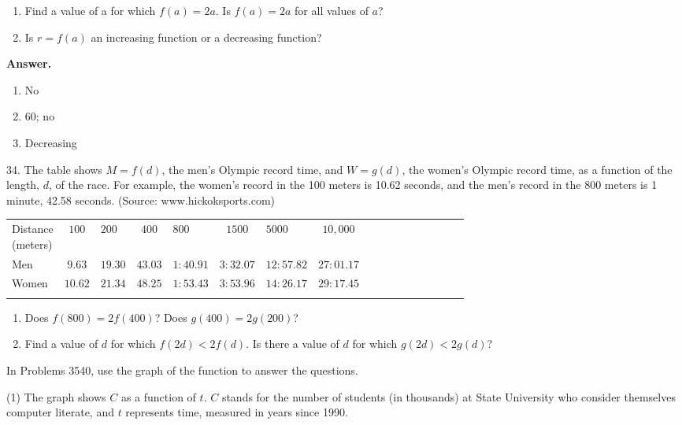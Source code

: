 \documentclass[10pt,]{book}
\makeatletter
\theoremstyle{plain}
\theoremstyle{definition}
\theoremstyle{definition}
\theoremstyle{definition}
\newcommand{\hrulethin}  {\noalign{\hrule height 0.04em}}
\newcommand{\hrulethick} {\noalign{\hrule height 0.11em}}
\newcommand{\tablecelllines}[3]%
{\begin{tabular}[#2]{@{}#1@{}}#3\end{tabular}}
\newcommand{\lt}{<}
\makeatother
\begin{document}
\begin{exerciselist}
\begin{enumerate}[label=\alph*]
\item\hypertarget{li-110}{}Find a value of a for which \(f (a) = 2a\). Is \(f (a) = 2a\) for all values of \(a\)?%
\item\hypertarget{li-111}{}Is \(r = f (a)\) an increasing function or a decreasing function?%
\end{enumerate}
%
\par\smallskip
\par\smallskip
\noindent\textbf{Answer.}\hypertarget{answer-27}{}\quad
\leavevmode%
\begin{enumerate}[label=\alph*]
\item\hypertarget{li-112}{}No%
\item\hypertarget{li-113}{}60; no%
\item\hypertarget{li-114}{}Decreasing%
\end{enumerate}
%
\item[34.]\hypertarget{exercise-44}{}The table shows \(M = f (d)\), the men's Olympic record time, and \(W = g(d)\), the women's Olympic record time, as a function of the length, \(d\), of the race. For example, the women’s record in the 100 meters is 10.62 seconds, and the men’s record in the 800 meters is 1 minute, 42.58 seconds. (Source: www.hickoksports.com) \begin{tabular}{AcAcAcAcAcAcAcAcA}\hrulethick
\tablecelllines{c}{m}
{Distance\\
(meters)}
&\(100\)&\(200\)&\(400\)&\(800\)&\(1500\)&\(5000\)&\(10,000\)\tabularnewline\hrulethin
Men&\(9.63\)&\(19.30\)&\(43.03\)&\(1:40.91\)&\(3:32.07\)&\(12:57.82\)&\(27:01.17\)\tabularnewline\hrulethin
Women&\(10.62\)&\(21.34\)&\(48.25\)&\(1:53.43\)&\(3:53.96\)&\(14:26.17\)&\(29:17.45\)\tabularnewline\hrulethin
\end{tabular}
 \leavevmode%
\begin{enumerate}[label=\alph*]
\item\hypertarget{li-115}{}Does \(f (800) = 2 f (400)\)? Does \(g(400) = 2g(200)\)?%
\item\hypertarget{li-116}{}Find a value of \(d\) for which \(f (2d)\lt 2f (d)\). Is there a value of \(d\) for which \(g(2d)\lt 2g(d)\)?%
\end{enumerate}
%
\par\smallskip
\hypertarget{exercisegroup-5}{}\par\noindent In Problems 35\textemdash{}40, use the graph of the function to answer the questions.%
\begin{exercisegroup}(1)
\exercise[35.]\hypertarget{exercise-45}{}The graph shows \(C\) as a function of \(t\). \(C\) stands for the number of students (in thousands) at State University who consider themselves computer literate, and \(t\) represents time, measured in years since 1990.%

\end{exercisegroup}
\end{exerciselist}
\end{document}
